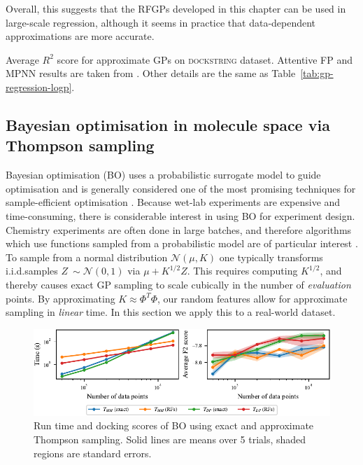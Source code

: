 Overall, this suggests that the RFGPs developed in this chapter can be used in large-scale regression,
although it seems in practice that data-dependent approximations are more accurate.

\begin{table}[tb]
\caption[$R^2$ scores of various approximate GPs on dockstring test set.]{
Average $R^2$ score for approximate GPs on \textsc{dockstring} dataset.
Attentive FP and MPNN results
are taken from \citet{ortegon2021dockstring}.
Other details are the same as Table~\ref{tab:gp-regression-logp}.
}
\label{tab:gp-regression-r2}
\begin{center}
\resizebox{0.95\textwidth}{!}{
\begin{sc}

\end{sc}
}
\end{center}
\end{table}





\subsection{Bayesian optimisation in molecule space via Thompson sampling}\label{sec:expt-bayesopt}

Bayesian optimisation (BO) uses a probabilistic surrogate model to guide optimisation
and is generally considered one of the most promising techniques for sample-efficient optimisation \citep{shahriari2015taking}.
Because wet-lab experiments are expensive and time-consuming,
there is considerable interest in using BO for experiment design.
Chemistry experiments are often done in large batches,
and therefore algorithms which use functions sampled from a probabilistic model are of particular interest \citep{hernandez2017parallel}.
To sample from a normal distribution $\mathcal{N}(\mu,K)$ one typically transforms i.i.d.\@ samples $Z~\sim\mathcal{N}(0,1)$ via $\mu+K^{1/2}Z$.
This requires computing $K^{1/2}$, and thereby causes exact GP sampling to scale cubically in the number of \emph{evaluation} points.
By approximating $K\approx \Phi^T \Phi$,
our random features allow for approximate sampling in \emph{linear} time.
In this section we apply this to a real-world dataset.

\begin{figure}[h]
    \centering
    \includegraphics{chapter0x-TRF/new-figures/bo_results.pdf}
    \caption[Results of Bayesian optimisation using exact and approximate Thompson sampling.]{
        Run time and docking scores of BO using exact and approximate Thompson sampling.
        Solid lines are means over 5 trials, shaded regions are standard errors.
    }
    \label{fig:thompson-sampling-results}
\end{figure}

